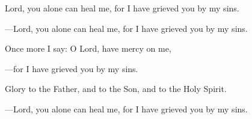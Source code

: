 \responsory
\begin{hangpar}

Lord, you alone can heal me, for I have grieved you by my sins.

{\color{red}---\thinspace}Lord, you alone can heal me, for I have grieved you by my sins.

\medskip Once more I say: O Lord, have mercy on me,

{\color{red}---\thinspace}for I have grieved you by my sins.

\medskip Glory to the Father, and to the Son, and to the Holy Spirit.

{\color{red}---\thinspace}Lord, you alone can heal me, for I have grieved you by my sins.
\end{hangpar}

